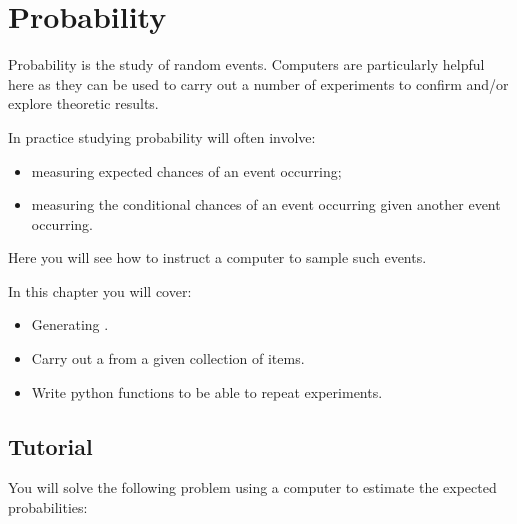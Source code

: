 \chapter{Probability}
\label{chp:probability}

Probability is the study of random events. Computers are particularly helpful
here as they can be used to carry out a number of experiments to confirm and/or
explore theoretic results.

In practice studying probability will often involve:
\begin{itemize}
\item 

measuring expected chances of an event occurring;

\item 

measuring the conditional chances of an event occurring given another event
occurring.

\end{itemize}


Here you will see how to instruct a computer to sample such events.



\begin{note}
In this chapter you will cover:
\begin{itemize}
\item 

Generating .

\item 

Carry out a  from a given collection of items.

\item 

Write python functions to be able to repeat experiments.

\end{itemize}
\end{note}




\section{Tutorial}
\label{\detokenize{tools-for-mathematics/06-probability/tutorial/main:tutorial}}\label{\detokenize{tools-for-mathematics/06-probability/tutorial/main::doc}}

You will solve the following problem using a computer to estimate the expected
probabilities:

